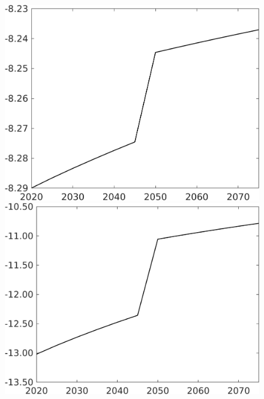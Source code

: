 \documentclass[12pt]{article}
\begin{document}
\begin{figure}[h!!]
\begin{minipage}[]{0.32\textwidth}
	\end{minipage}
	\begin{minipage}[]{0.32\textwidth}
		\includegraphics[width=1\textwidth]{../../codding_model/own_basedOnFried/optimalPol_010922_revision/figures/all_13Sept22/CompTaufPER_bytaul_Reg0_Ln_spillover0_nsk0_xgr1_knspil0_sep0_LFlimit1_emsbase0_countec0_GovRev0_etaa0.79_lgd0.png}
	\end{minipage}			
	\begin{minipage}[]{0.32\textwidth}
		\includegraphics[width=1\textwidth]{../../codding_model/own_basedOnFried/optimalPol_010922_revision/figures/all_13Sept22/CompTaufPER_bytaul_Reg0_GFF_spillover0_nsk0_xgr1_knspil0_sep0_LFlimit1_emsbase0_countec0_GovRev0_etaa0.79_lgd0.png}

\end{minipage}
\end{figure}
\end{document}
